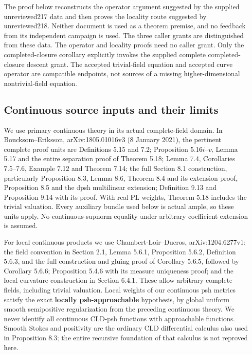 \documentclass[
]{article}
\begin{document}
The proof below reconstructs the operator argument suggested by the
supplied unreviewed217 data and then proves the locality route suggested
by unreviewed218. Neither document is used as a theorem premise, and no
feedback from its independent campaign is used. The three caller grants
are distinguished from these data. The operator and locality proofs need
no caller grant. Only the completed-closure corollary explicitly invokes
the supplied complete completed-closure descent grant. The accepted
trivial-field equation and accepted curve operator are compatible
endpoints, not sources of a missing higher-dimensional nontrivial-field
equation.

\subsection{Continuous source inputs and their
limits}\label{continuous-source-inputs-and-their-limits}

We use primary continuous theory in its actual complete-field domain. In
Boucksom--Eriksson, arXiv:1805.01016v3 (8 January 2021), the pertinent
complete proof units are Definitions 5.15 and 7.2; Proposition
5.16\(i\)--\(v\), Lemma 5.17 and the entire separation proof of Theorem
5.18; Lemma 7.4, Corollaries 7.5--7.6, Example 7.12 and Theorem 7.14;
the full Section 8.1 construction, particularly Proposition 8.3, Lemma
8.6, Theorem 8.4 and its extension proof, Proposition 8.5 and the dpsh
multilinear extension; Definition 9.13 and Proposition 9.14 with its
proof. With real PL weights, Theorem 5.18 includes the trivial
valuation. Every auxiliary bundle used below is actual ample, so these
units apply. No continuous-supnorm equality under arbitrary coefficient
extension is assumed.

For local continuous products we use Chambert-Loir--Ducros,
arXiv:1204.6277v1: the field convention in Section 2.1, Lemma 5.6.1,
Proposition 5.6.2, Definition 5.6.3, and the full construction and
gluing proof of Corollary 5.6.5, followed by Corollary 5.6.6;
Proposition 5.4.6 with its measure uniqueness proof; and the local
curvature construction in Section 6.4.1. These allow arbitrary complete
fields, including trivial valuation. Local weights of our continuous psh
metrics satisfy the exact \textbf{locally psh-approachable} hypothesis,
by global uniform smooth semipositive regularization from the preceding
continuous theory. We never identify all continuous CLD-psh functions
with approachable functions. Smooth Stokes and positivity are the
ordinary CLD differential calculus also used in Proposition 8.3; the
entire recursive foundation of that calculus is not reproved here.
\end{document}
